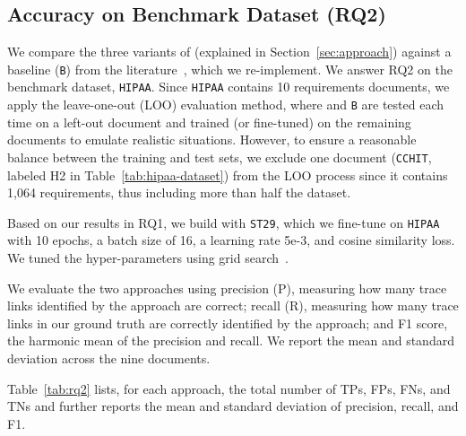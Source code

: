 \subsection{Accuracy on Benchmark Dataset (RQ2) } \label{subsec:rq2}

 We compare the three variants of \kashif (explained in Section~\ref{sec:approach}) against a baseline (\texttt{B}) from the literature~\cite{cleland:2010,Guo:17}, which we re-implement. 
We answer RQ2 on the benchmark dataset, \texttt{HIPAA}.  Since \texttt{HIPAA} contains 10 requirements documents, we apply the leave-one-out (LOO) evaluation method, where \kashif and \texttt{B} are tested each time on a left-out document and trained (or fine-tuned) on the remaining documents to emulate realistic situations.  
However, to ensure a reasonable balance between the training and test sets, we exclude one document (\texttt{CCHIT}, labeled H2 in Table~\ref{tab:hipaa-dataset}) from the LOO process since it contains 1,064 requirements, thus including more than half the dataset. 

 Based on our results in RQ1, we build \kashif with \texttt{ST29}, which we fine-tune on \texttt{HIPAA} with 10 epochs, a batch size of 16, a learning rate 5e-3, and cosine similarity loss. We tuned the hyper-parameters using grid search~\cite{Bergstra:12}. 

 We evaluate the two approaches using precision (P), measuring how many trace links identified by the approach are correct; recall (R), measuring how many trace links in our ground truth are correctly identified by the approach; and F1 score, the harmonic mean of the precision and recall.
%
We report the mean and standard deviation across the nine documents.  


Table~\ref{tab:rq2} lists, for each approach, the total number of TPs, FPs, FNs, and TNs and further reports the mean and standard deviation of precision, recall, and F1. 




